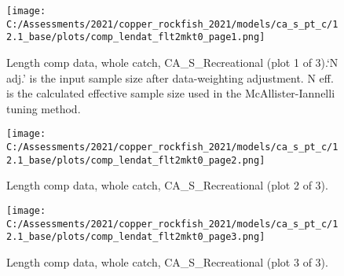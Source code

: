\documentclass[11pt,
  english,
  a4paper,
]{article}
\begin{document}
\tagmcend\tagstructend


\begin{figure}
\centering
\texttt{[image: C:/Assessments/2021/copper\_rockfish\_2021/models/ca\_s\_pt\_c/12.1\_base/plots/comp\_lendat\_flt2mkt0\_page1.png]}
\caption{Length comp data, whole catch, CA\_S\_Recreational (plot 1 of 3).`N adj.' is the input sample size after data-weighting adjustment. N eff. is the calculated effective sample size used in the McAllister-Iannelli tuning method.\label{fig:comp_lendat_flt2mkt0_page1}}
\end{figure}

\tagmcend\tagstructend


\begin{figure}
\centering
\texttt{[image: C:/Assessments/2021/copper\_rockfish\_2021/models/ca\_s\_pt\_c/12.1\_base/plots/comp\_lendat\_flt2mkt0\_page2.png]}
\caption{Length comp data, whole catch, CA\_S\_Recreational (plot 2 of 3).\label{fig:comp_lendat_flt2mkt0_page2}}
\end{figure}

\tagmcend\tagstructend


\begin{figure}
\centering
\texttt{[image: C:/Assessments/2021/copper\_rockfish\_2021/models/ca\_s\_pt\_c/12.1\_base/plots/comp\_lendat\_flt2mkt0\_page3.png]}
\caption{Length comp data, whole catch, CA\_S\_Recreational (plot 3 of 3).\label{fig:comp_lendat_flt2mkt0_page3}}
\end{figure}

\tagmcend\tagstructend

\end{document}
